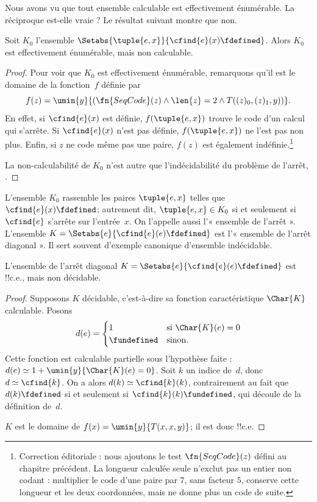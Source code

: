 \documentclass[../../../include/open-logic-section]{subfiles}
\begin{document}

Nous avons vu que tout ensemble calculable est
effectivement énumérable. La réciproque est-elle
vraie ? Le résultat suivant montre que non.

\begin{thm}
Soit $K_0$ l'ensemble
$\Setabs{\tuple{e, x}}{\cfind{e}(x) \fdefined}$.
Alors $K_0$ est effectivement énumérable,
mais non calculable.
\end{thm}

\begin{proof}
Pour voir que $K_0$ est effectivement énumérable,
remarquons qu'il est le domaine de la fonction~$f$
définie par
\[
f(z) = \umin{y}{(\fn{SeqCode}(z) \land \len{z} = 2 \land T((z)_0, (z)_1, y))}.
\]
En effet, si $\cfind{e}(x)$ est définie,
$f(\tuple{e,x})$ trouve le code d'un calcul qui
s'arrête. Si $\cfind{e}(x)$ n'est pas définie,
$f(\tuple{e,x})$ ne l'est pas non plus. Enfin,
si $z$ ne code même pas une paire, $f(z)$ est
également indéfinie.\footnote{Correction éditoriale : nous ajoutons le test $\fn{SeqCode}(z)$ défini au chapitre précédent. La longueur calculée seule n'exclut pas un entier non codant : multiplier le code d'une paire par $7$, sans facteur $5$, conserve cette longueur et les deux coordonnées, mais ne donne plus un code de suite.}

La non-calculabilité de $K_0$ n'est autre que
l'indécidabilité du problème de l'arrêt,
.
\end{proof}

L'ensemble $K_0$ rassemble les paires
$\tuple{e,x}$ telles que $\cfind{e}(x)\fdefined$;
autrement dit, $\tuple{e,x}\in K_0$ si et
seulement si $\cfind{e}$ s'arrête sur l'entrée~$x$.
On l'appelle aussi l'« ensemble de l'arrêt ».
L'ensemble
$K=\Setabs{e}{\cfind{e}(e)\fdefined}$ est
l'« ensemble de l'arrêt diagonal ». Il sert souvent
d'exemple canonique d'ensemble indécidable.

\begin{thm}
L'ensemble de l'arrêt diagonal
$K=\Setabs{e}{\cfind{e}(e)\fdefined}$ est
!!{c.e.}, mais non décidable.
\end{thm}

\begin{proof}
Supposons $K$ décidable, c'est-à-dire sa fonction
caractéristique $\Char{K}$ calculable. Posons
\[d(e) = \begin{cases}
  1 & \text{si\/ $\Char{K}(e) = 0$}\\
  \fundefined & \text{sinon.}
  \end{cases}
  \]
Cette fonction est calculable partielle sous l'hypothèse faite : $d(e)\simeq 1+\umin{y}{\Char{K}(e)=0}$. Soit $k$ un indice de~$d$, donc
$d\simeq\cfind{k}$. On a alors
$d(k)\simeq\cfind{k}(k)$, contrairement au
fait que $d(k)\fdefined$ si et seulement si
$\cfind{k}(k)\fundefined$, qui découle
de la définition de~$d$.

$K$ est le domaine de
$f(x)=\umin{y}{T(x,x,y)}$;
il est donc !!{c.e.}
\end{proof}
\end{document}
